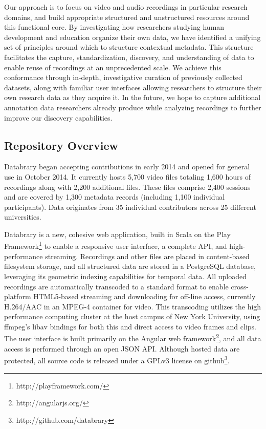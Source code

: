 \documentclass{sig-alternate}
\begin{document}
Our approach is to focus on video and audio recordings in particular research domains, and build appropriate structured and unstructured resources around this functional core.
By investigating how researchers studying human development and education organize their own data, we have identified a unifying set of principles around which to structure contextual metadata.
This structure facilitates the capture, standardization, discovery, and understanding of data to enable reuse of recordings at an unprecedented scale.
We achieve this conformance through in-depth, investigative curation of previously collected datasets, along with familiar user interfaces allowing researchers to structure their own research data as they acquire it.
In the future, we hope to capture additional annotation data researchers already produce while analyzing recordings to further improve our discovery capabilities.

\subsection*{Repository Overview}

Databrary began accepting contributions in early 2014 and opened for general use in October 2014.
It currently hosts 5,700 video files totaling 1,600 hours of recordings along with 2,200 additional files.
These files comprise 2,400 sessions and are covered by 1,300 metadata records (including 1,100 individual participants).
Data originates from 35 individual contributors across 25 different universities.

Databrary is a new, cohesive web application, built in Scala on the Play Framework\footnote{http://playframework.com/} to enable a responsive user interface, a complete API, and high-performance streaming.
Recordings and other files are placed in content-based filesystem storage, and all structured data are stored in a PostgreSQL database, leveraging its geometric indexing capabilities for temporal data.
All uploaded recordings are automatically transcoded to a standard format to enable cross-platform HTML5-based streaming and downloading for off-line access, currently H.264/AAC in an MPEG-4 container for video.
This transcoding utilizes the high performance computing cluster at the host campus of New York University, using ffmpeg's libav bindings for both this and direct access to video frames and clips.
The user interface is built primarily on the Angular web framework\footnote{http://angularjs.org/}, and all data access is performed through an open JSON API.
Although hosted data are protected, all source code is released under a GPLv3 license on github\footnote{http://github.com/databrary}.
\end{document}

